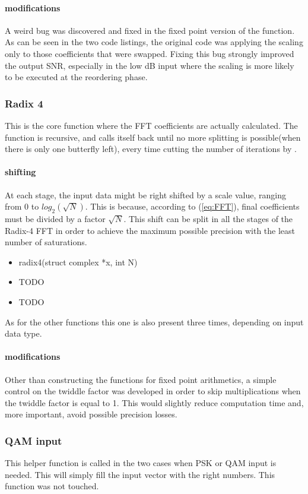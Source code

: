 \documentclass[a4paper]{article}
\begin{document}
	\paragraph{modifications}
	A weird bug was discovered and fixed in the fixed point version of the function. As can be seen in the two code listings, the original code was applying the scaling only to those coefficients that were swapped. Fixing this bug strongly improved the output SNR, especially in the low dB input where the scaling is more likely to be executed at the reordering phase.


\subsubsection{Radix 4}
\label{SUB:Radix4}
This is the core function where the FFT coefficients are actually calculated. The function is recursive, and calls itself back until no more splitting is possible(when there is only one butterfly left), every time cutting the number of iterations by .
\paragraph{shifting}
At each stage, the input data might be right shifted by a scale value, ranging from 0 to $log_2(\sqrt{N})$. This is because, according to (\ref{eq:FFT}), final coefficients must be divided by a factor $\sqrt{N}$. This shift can be split in all the stages of the Radix-4 FFT in order to achieve the maximum possible precision with the least number of saturations.
\begin{itemize}
	\item radix4(struct complex *x, int N)
	\item TODO
	\item TODO
\end{itemize}
As for the other functions this one is also present three times, depending on input data type.
\paragraph{modifications}
Other than constructing the functions for fixed point arithmetics, a simple control on the twiddle factor was developed in order to skip multiplications when the twiddle factor is equal to 1. This would slightly reduce computation time and, more important, avoid possible precision losses. 

\subsubsection{QAM input}
This helper function is called in the two cases when PSK or QAM input is needed. This will simply fill the input vector with the right numbers. This function was not touched.
\end{document}
